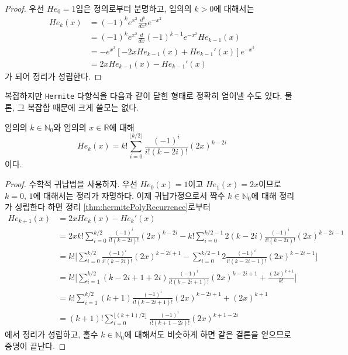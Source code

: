 \begin{proof}
    우선 $He_0=1$임은 정의로부터 분명하고, 임의의 $k>0$에 대해서는
    \begin{align*}
        He_k(x)&=(-1)^ke^{x^2}\frac{d^k}{dx^k}e^{-x^2}\\
        &=(-1)^ke^{x^2}\frac{d}{dx}(-1)^{k-1}e^{-x^2}He_{k-1}(x)\\
        &=-e^{x^2}[-2xHe_{k-1}(x)+He_{k-1}'(x)]e^{-x^2}\\
        &=2xHe_{k-1}(x)-He_{k-1}'(x)
    \end{align*}
    가 되어 정리가 성립한다.
\end{proof}

복잡하지만 \texttt{Hermite} 다항식을 다음과 같이 닫힌 형태로 정확히 얻어낼 수도 있다. 물론, 그 복잡함 때문에 크게 쓸모는 없다.

\begin{theorem}\label{thm:hermitePolyExpansion}
    임의의 $k\in\mathbb{N}_0$와 임의의 $x\in\mathbb{R}$에 대해
    \begin{equation*}
        He_k(x)=k!\sum_{i=0}^{\lfloor k/2\rfloor}\frac{(-1)^i}{i!(k-2i)!}(2x)^{k-2i}
    \end{equation*}
    이다.
\end{theorem}

\begin{proof}
    수학적 귀납법을 사용하자. 우선 $He_0(x)=1$이고 $He_1(x)=2x$이므로 $k=0,\,1$에 대해서는 정리가 자명하다. 이제 귀납가정으로서 짝수 $k\in\mathbb{N}_0$에 대해 정리가 성립한다 하면 정리 \ref{thm:hermitePolyRecurrence}로부터
    \begin{align*}
        He_{k+1}(x)&=2xHe_k(x)-He_k'(x)\\
        &=2xk!\sum_{i=0}^{k/2}\frac{(-1)^i}{i!(k-2i)!}(2x)^{k-2i}-k!\sum_{i=0}^{k/2-1}2(k-2i)\frac{(-1)^i}{i!(k-2i)!}(2x)^{k-2i-1}\\
        &=k!\bigg[\sum_{i=0}^{k/2}\frac{(-1)^i}{i!(k-2i)!}(2x)^{k-2i+1}-\sum_{i=0}^{k/2-1}2\frac{(-1)^i}{i!(k-2i-1)!}(2x)^{k-2i-1}\bigg]\\
        &=k!\bigg[\sum_{i=1}^{k/2}(k-2i+1+2i)\frac{(-1)^i}{i!(k-2i+1)!}(2x)^{k-2i+1}+\frac{(2x)^{k+1}}{k!}\bigg]\\
        &=k!\sum_{i=1}^{k/2}(k+1)\frac{(-1)^i}{i!(k-2i+1)!}(2x)^{k-2i+1}+(2x)^{k+1}\\
        &=(k+1)!\sum_{i=0}^{\lfloor(k+1)/2\rfloor}\frac{(-1)^i}{i!(k+1-2i)!}(2x)^{k+1-2i}
    \end{align*}
    에서 정리가 성립하고, 홀수 $k\in\mathbb{N}_0$에 대해서도 비슷하게 하면 같은 결론을 얻으므로 증명이 끝난다.
\end{proof}

